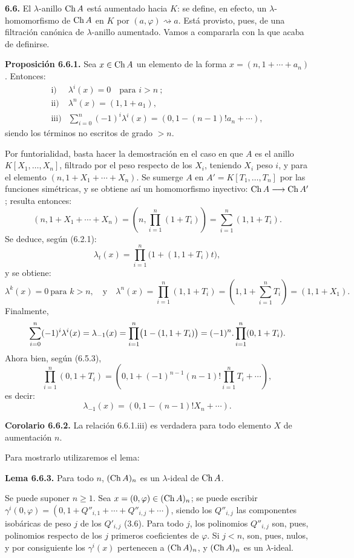 \textbf{6.6.} El \(\lambda\)-anillo \(\Ch A\) está aumentado hacia \(K\): se define, en efecto, un \(\lambda\)-homomorfismo de \(\Ch A\) en \(K\) por \((a,\varphi)\rightsquigarrow a\). Está provisto, pues, de una filtración canónica de \(\lambda\)-anillo aumentado. Vamos a compararla con la que acaba de definirse.

\textbf{Proposición 6.6.1.} Sea \(x\in\Ch A\) un elemento de la forma \(x=(n,1+\cdots+a_n)\). Entonces:
\[
\begin{array}{ll}
\text{i)}& \lambda^i(x)=0\quad\text{para }i>n~;\\[0.3em]
\text{ii)}& \lambda^n(x)=(1,1+a_1),\\[0.3em]
\text{iii)}& \displaystyle\sum_{i=0}^n(-1)^i\lambda^i(x)
       =(0,1-(n-1)!a_n+\cdots),
\end{array}
\]
siendo los términos no escritos de grado \(>n\).

Por funtorialidad, basta hacer la demostración en el caso en que \(A\) es el anillo \(K[X_1,\ldots,X_n]\), filtrado por el peso respecto de los \(X_i\), teniendo \(X_i\) peso \(i\), y para el elemento \((n,1+X_1+\cdots+X_n)\). Se sumerge \(A\) en \(A'=K[T_1,\ldots,T_n]\) por las funciones simétricas, y se obtiene así un homomorfismo inyectivo: \(\Ch A\longrightarrow\Ch A'\); resulta entonces:
\[
 (n,1+X_1+\cdots+X_n)
 =
 \left(n,\prod_{i=1}^n(1+T_i)\right)
 =
 \sum_{i=1}^n(1,1+T_i).
\]
Se deduce, según (6.2.1):
\[
  \lambda_t(x)=\prod_{i=1}^n\bigl(1+(1,1+T_i)t\bigr),
\]
y se obtiene:
\[
  \lambda^k(x)=0\ \text{para }k>n,\quad\text{y}\quad
  \lambda^n(x)=\prod_{i=1}^n(1,1+T_i)
   =\left(1,1+\sum_{i=1}^nT_i\right)=(1,1+X_1).
\]
Finalmente,
\[
  \sisi{\sum_{i=1}^n}{\sum_{i=0}^n}(-1)^i\lambda^i(x)=\lambda_{-1}(x)
  =
  \prod_{i=1}^n\bigl(1-(1,1+T_i)\bigr)
  =
  (-1)^n.\prod_{i=1}^n(0,1+T_i).
\]
Ahora bien, según (6.5.3),
\[
  \prod_{i=1}^n(0,1+T_i)
  =
  \left(0,1+(-1)^{n-1}(n-1)!\prod_{i=1}^nT_i+\cdots\right),
\]
es decir:
\[
  \lambda_{-1}(x)=(0,1-(n-1)!X_n+\cdots).
\]

\textbf{Corolario 6.6.2.} La relación 6.6.1.iii) es verdadera para todo elemento \(X\) de aumentación \(n\).

Para mostrarlo utilizaremos el lema:

\textbf{Lema 6.6.3.} Para todo \(n\), \((\Ch A)_n\) es un \(\lambda\)-ideal de \(\Ch A\).

Se puede suponer \(n\ge1\). Sea \(x=(0,\varphi)\in(\Ch A)_n\); se puede escribir \(\gamma^i(0,\varphi)=(0,1+Q''_{i,1}+\cdots+Q''_{i,j}+\cdots)\), siendo los \(Q''_{i,j}\) las componentes isobáricas de peso \(j\) de los \(Q'_{i,j}\) (3.6). Para todo \(j\), los polinomios \(Q''_{i,j}\) son, pues, polinomios respecto de los \(j\) primeros coeficientes de \(\varphi\). Si \(j<n\), son, pues, nulos, y por consiguiente los \(\gamma^i(x)\) pertenecen a \((\Ch A)_n\), y \((\Ch A)_n\) es un \(\lambda\)-ideal.

